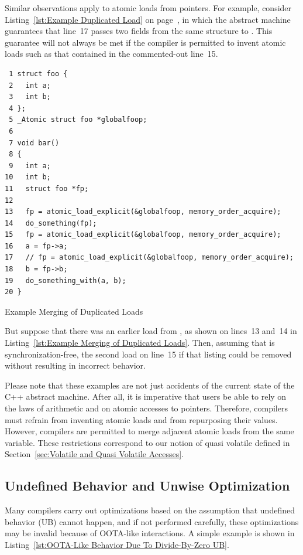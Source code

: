\documentclass[10]{article}
\begin{document}
Similar observations apply to atomic loads from pointers.
For example, consider
Listing~\ref{lst:Example Duplicated Load} on
page~\pageref{lst:Example Duplicated Load},
in which the abstract machine guarantees that line~17 passes two
fields from the same structure to .
This guarantee will not always be met if the compiler is permitted to
invent atomic loads such as that contained in the commented-out line~15.
\begin{listing}[tbp]
\scriptsize
\begin{verbatim}
 1 struct foo {
 2   int a;
 3   int b;
 4 };
 5 _Atomic struct foo *globalfoop;
 6
 7 void bar()
 8 {
 9   int a;
10   int b;
11   struct foo *fp;
12
13   fp = atomic_load_explicit(&globalfoop, memory_order_acquire);
14   do_something(fp);
15   fp = atomic_load_explicit(&globalfoop, memory_order_acquire);
16   a = fp->a;
17   // fp = atomic_load_explicit(&globalfoop, memory_order_acquire);
18   b = fp->b;
19   do_something_with(a, b);
20 }
\end{verbatim}
\caption{Example Merging of Duplicated Loads}
\label{lst:Example Merging of Duplicated Loads}
\end{listing}
But suppose that there was an earlier load from , as
shown on lines~13 and~14 in
Listing~\ref{lst:Example Merging of Duplicated Loads}.
Then, assuming that  is synchronization-free, the
second load on line~15 if that listing could be removed without resulting
in incorrect behavior.

Please note that these examples are not just accidents of the current state
of the C++ abstract machine.
After all, it is imperative that users be able to rely on the laws of
arithmetic and on atomic accesses to pointers.
Therefore, compilers must refrain from inventing atomic loads and from repurposing
their values.
However, compilers are permitted to merge adjacent atomic loads from
the same variable.
These restrictions correspond to our notion of quasi volatile defined in
Section~\ref{sec:Volatile and Quasi Volatile Accesses}.

\subsection{Undefined Behavior and Unwise Optimization}
\label{app:Undefined Behavior and Unwise Optimization}

Many compilers carry out optimizations based on the assumption
that undefined behavior (UB) cannot happen,
and if not performed carefully, these optimizations may be invalid
because of OOTA-like interactions.
A simple example is shown in
Listing~\ref{lst:OOTA-Like Behavior Due To Divide-By-Zero UB}.
\end{document}

